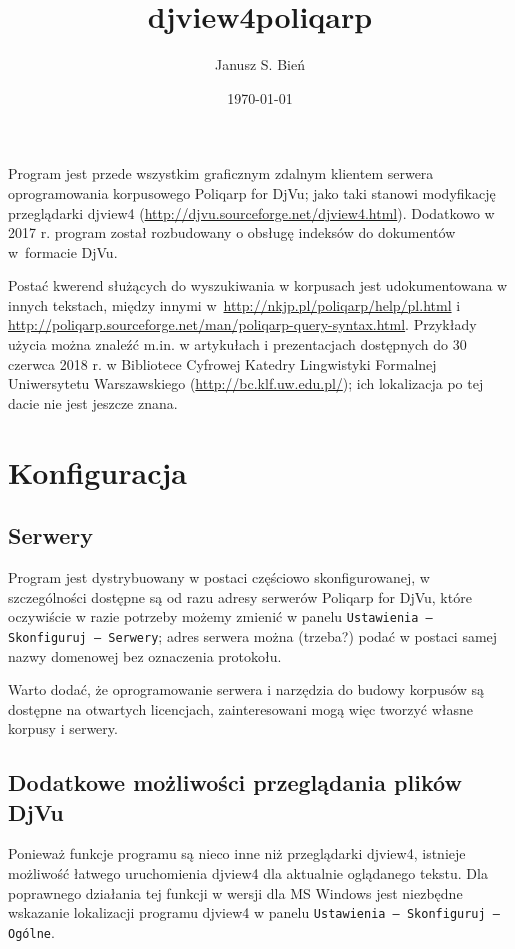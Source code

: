 \documentclass{mwart}
\title{djview4poliqarp}
\author{Janusz S. Bień}
\date{\today}
\begin{document}
\maketitle
\thispagestyle{empty}
\pagestyle{empty}

Program jest przede wszystkim graficznym zdalnym klientem serwera
oprogramowania korpusowego \textsf{Poliqarp for DjVu}; jako taki
stanowi modyfikację przeglądarki \textsf{djview4}
(\url{http://djvu.sourceforge.net/djview4.html}). Dodatkowo w 2017
r. program został rozbudowany o obsługę indeksów do dokumentów
w~formacie DjVu.

Postać kwerend służących do wyszukiwania w korpusach jest
udokumentowana w innych tekstach, między innymi
w~\url{http://nkjp.pl/poliqarp/help/pl.html} i
\url{http://poliqarp.sourceforge.net/man/poliqarp-query-syntax.html}.
Przykłady użycia można znaleźć m.in. w artykułach i prezentacjach
dostępnych do 30 czerwca 2018 r. w Bibliotece Cyfrowej Katedry
Lingwistyki Formalnej Uniwersytetu Warszawskiego
(\url{http://bc.klf.uw.edu.pl/}); ich lokalizacja po tej dacie nie
jest jeszcze znana.

\section{Konfiguracja}
\label{sec:konfiguracja}

\subsection{Serwery}
\label{sec:serwery}

Program jest dystrybuowany w postaci częściowo skonfigurowanej, w
szczególności dostępne są od razu adresy serwerów \textsf{Poliqarp for
  DjVu}, które oczywiście w razie potrzeby możemy zmienić w panelu
\texttt{Ustawienia --- Skonfiguruj --- Serwery}; adres serwera można
(trzeba?)  podać w postaci samej nazwy domenowej bez oznaczenia
protokołu.

Warto dodać, że oprogramowanie serwera i narzędzia do budowy korpusów
są dostępne na otwartych licencjach, zainteresowani mogą więc tworzyć
własne korpusy i serwery.

\subsection{Dodatkowe możliwości przeglądania plików DjVu}
\label{sec:dodatk-moliw-przegld}

Ponieważ funkcje programu są nieco inne niż przeglądarki
\textsf{djview4}, istnieje możliwość łatwego uruchomienia
\textsf{djview4} dla aktualnie oglądanego tekstu. Dla poprawnego
działania tej funkcji w wersji dla MS Windows jest niezbędne wskazanie
lokalizacji programu \textsf{djview4} w panelu \texttt{Ustawienia ---
  Skonfiguruj --- Ogólne}.
\end{document}
